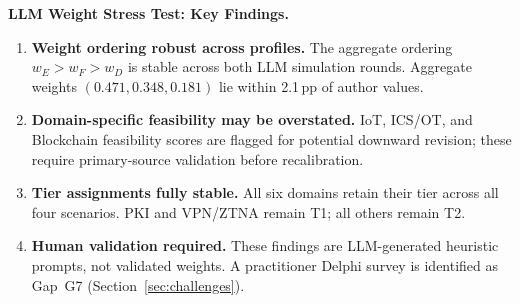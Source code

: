 \begin{mdframed}[backgroundcolor=blue!4,linecolor=blue!40,linewidth=0.6pt,
  innertopmargin=4pt,innerbottommargin=4pt]
\small\textbf{LLM Weight Stress Test: Key Findings.}
\begin{enumerate}[leftmargin=*,itemsep=2pt,topsep=2pt]
  \item \textbf{Weight ordering robust across profiles.}
  The aggregate ordering $w_E{>}w_F{>}w_D$ is stable across both
  LLM simulation rounds. Aggregate weights $(0.471, 0.348, 0.181)$ lie
  within 2.1\,pp of author values.

  \item \textbf{Domain-specific feasibility may be overstated.}
  IoT, ICS/OT, and Blockchain feasibility scores are flagged for
  potential downward revision; these require primary-source validation
  before recalibration.

  \item \textbf{Tier assignments fully stable.}
  All six domains retain their tier across all four scenarios.
  PKI and VPN/ZTNA remain T1; all others remain T2.

  \item \textbf{Human validation required.}
  These findings are LLM-generated heuristic prompts, not validated
  weights. A practitioner Delphi survey is identified as Gap~G7
  (Section~\ref{sec:challenges}).
\end{enumerate}
\end{mdframed}
